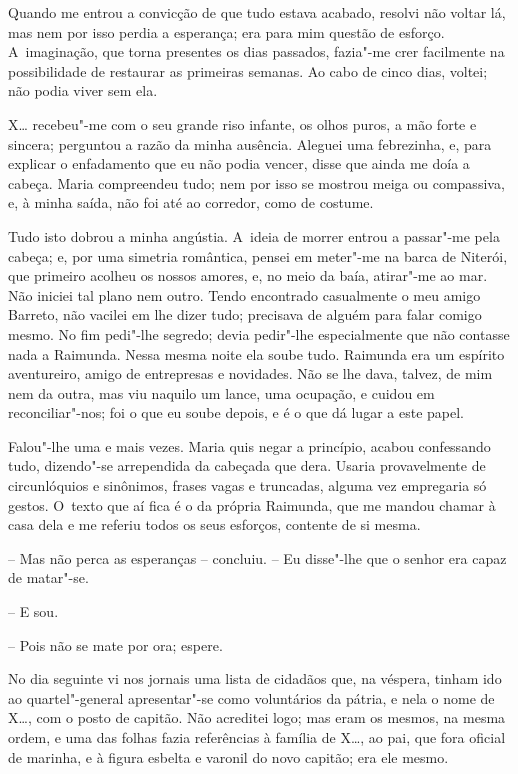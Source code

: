 Quando me entrou a convicção de que tudo estava acabado, resolvi não
voltar lá, mas nem por isso perdia a esperança; era para mim questão de
esforço. A~imaginação, que torna presentes os dias passados, fazia"-me
crer facilmente na possibilidade de restaurar as primeiras semanas. Ao
cabo de cinco dias, voltei; não podia viver sem ela.

X\ldots{} recebeu"-me com o seu grande riso infante, os olhos puros, a mão
forte e sincera; perguntou a razão da minha ausência. Aleguei uma
febrezinha, e, para explicar o enfadamento que eu não podia vencer,
disse que ainda me doía a cabeça. Maria compreendeu tudo; nem por isso
se mostrou meiga ou compassiva, e, à minha saída, não foi até ao
corredor, como de costume.

Tudo isto dobrou a minha angústia. A~ideia de morrer entrou a passar"-me
pela cabeça; e, por uma simetria romântica, pensei em meter"-me na barca
de Niterói, que primeiro acolheu os nossos amores, e, no meio da baía,
atirar"-me ao mar. Não iniciei tal plano nem outro. Tendo encontrado
casualmente o meu amigo Barreto, não vacilei em lhe dizer tudo;
precisava de alguém para falar comigo mesmo. No fim pedi"-lhe segredo;
devia pedir"-lhe especialmente que não contasse nada a Raimunda. Nessa
mesma noite ela soube tudo. Raimunda era um espírito aventureiro, amigo
de entrepresas e novidades. Não se lhe dava, talvez, de mim nem da
outra, mas viu naquilo um lance, uma ocupação, e cuidou em
reconciliar"-nos; foi o que eu soube depois, e é o que dá lugar a este
papel.

Falou"-lhe uma e mais vezes. Maria quis negar a princípio, acabou
confessando tudo, dizendo"-se arrependida da cabeçada que dera. Usaria
provavelmente de circunlóquios e sinônimos, frases vagas e truncadas,
alguma vez empregaria só gestos. O~texto que aí fica é o da própria
Raimunda, que me mandou chamar à casa dela e me referiu todos os seus
esforços, contente de si mesma.

-- Mas não perca as esperanças -- concluiu. -- Eu disse"-lhe que o senhor
era capaz de matar"-se.

-- E sou.

-- Pois não se mate por ora; espere.

No dia seguinte vi nos jornais uma lista de cidadãos que, na véspera,
tinham ido ao quartel"-general apresentar"-se como voluntários da pátria,
e nela o nome de X\ldots{}, com o posto de capitão. Não acreditei logo; mas
eram os mesmos, na mesma ordem, e uma das folhas fazia referências à
família de X\ldots{}, ao pai, que fora oficial de marinha, e à figura esbelta
e varonil do novo capitão; era ele mesmo.

